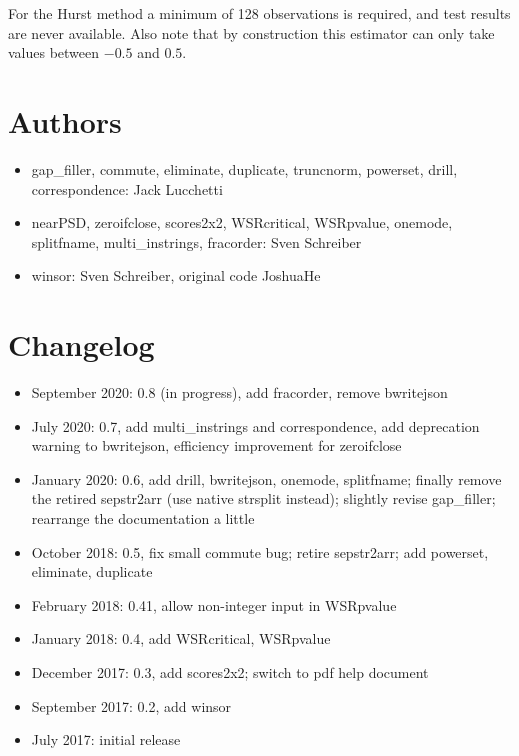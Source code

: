 \documentclass[11pt,english]{article}
\begin{document}
For the Hurst method a minimum of 128 observations is required, and test results are 
never available. Also note that by construction this estimator can only take values between
$-0.5$ and $0.5$.

\section{Authors}
\begin{itemize}
\item gap\_filler, commute, eliminate, duplicate, truncnorm, powerset,
  drill, correspondence: Jack Lucchetti

\item nearPSD, zeroifclose, scores2x2, WSRcritical, WSRpvalue, onemode,
splitfname, multi\_instrings, fracorder:
Sven Schreiber 

\item winsor: Sven Schreiber, original code JoshuaHe

\end{itemize}

\section{Changelog }
\begin{itemize}
\item September 2020: 0.8 (in progress), add fracorder, remove bwritejson
\item July 2020: 0.7, add multi\_instrings and correspondence, add deprecation warning to 
bwritejson, efficiency improvement for zeroifclose
\item January 2020: 0.6, add drill, bwritejson, onemode, splitfname;
  finally remove the retired sepstr2arr (use native strsplit instead);
  slightly revise gap\_filler; rearrange the documentation a little
\item October 2018: 0.5, fix small commute bug; retire sepstr2arr; add powerset,
  eliminate, duplicate
\item February 2018: 0.41, allow non-integer input in WSRpvalue
\item January 2018: 0.4, add WSRcritical, WSRpvalue
\item December 2017: 0.3, add scores2x2; switch to pdf help document
\item September 2017: 0.2, add winsor 
\item July 2017: initial release
\end{itemize}
\end{document}
